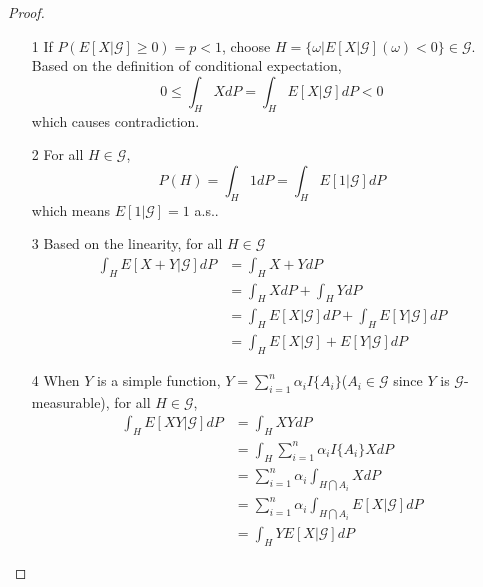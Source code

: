 \begin{proof}
    \begin{enumerate}
        \item[1] If $P(E[X|\mathcal{G}] \geq 0) = p <1$, choose $H = \{\omega|E[X|\mathcal{G}](\omega) < 0\}\in \mathcal{G}$. Based on the definition of conditional expectation,
        \begin{equation}
            0\leq \int_H X dP = \int_H E[X|\mathcal{G}] dP <0
        \end{equation} 
        which causes contradiction. 
        \item[2] For all $H \in \mathcal{G}$, 
        \begin{equation}
            P(H)=\int_H 1 dP = \int_H E[1|\mathcal{G}]dP
        \end{equation} 
        which means $E[1|\mathcal{G}] = 1$ a.s..
        \item[3] Based on the linearity, for all $H \in \mathcal{G}$
        \begin{equation}
            \begin{aligned}
                \int_H E[X+Y|\mathcal{G}] dP &= \int_H X+Y dP\\
                & = \int_H X dP + \int_H Y dP\\
                & = \int_H E[X|\mathcal{G}] dP + \int_H E[Y|\mathcal{G}] dP\\
                & = \int_H E[X|\mathcal{G}] + E[Y|\mathcal{G}] dP
            \end{aligned}
        \end{equation} 
        \item[4] When $Y$ is a simple function, $Y = \sum_{i=1}^n \alpha_i I\{A_i\}$($A_i \in \mathcal{G}$ since $Y$ is $\mathcal{G}$-measurable), for all $H \in \mathcal{G}$, 
        \begin{equation}
            \begin{aligned}
                \int_H E[XY|\mathcal{G}] dP &= \int_H XY dP \\
                & = \int_H \sum_{i=1}^n \alpha_i I\{A_i\} X dP \\
                & = \sum_{i=1}^n \alpha_i \int_{H\bigcap A_i} X dP\\
                & = \sum_{i=1}^n \alpha_i \int_{H\bigcap A_i} E[X|\mathcal{G}] dP\\
                & = \int_H YE[X|\mathcal{G}] dP 
            \end{aligned}
        \end{equation} 

\end{enumerate}
\end{proof}
